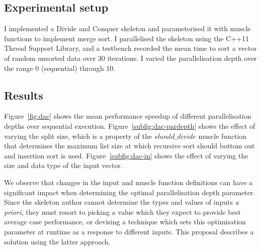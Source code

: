 \subsection{Experimental setup}
I implemented a Divide and Conquer skeleton and parameterised it with
muscle functions to implement merge sort. I parallelised the skeleton
using the C++11 Thread Support Library, and a testbench recorded the
mean time to sort a vector of random unsorted data over 30
iterations. I varied the parallelisation depth over the range 0
(sequential) through 10.

\subsection{Results}
Figure~\ref{fig:dac} shows the mean performance speedup of different
parallelisation depths over sequential
execution. Figure~\ref{subfig:dac-pardepth} shows the effect of
varying the split size, which is a property of the $should\_divide$
muscle function that determines the maximum list size at which
recursive sort should bottom out and insertion sort is
used. Figure~\ref{subfig:dac-in} shows the effect of varying the size
and data type of the input vector.

We observe that changes in the input and muscle function definitions
can have a significant impact when determining the optimal
parallelisation depth parameter. Since the skeleton author cannot
determine the types and values of inputs \emph{a priori}, they must
resort to picking a value which they expect to provide best average
case performance, or devising a technique which sets this optimisation
parameter at runtime as a response to different inputs. This proposal
describes a solution using the latter approach.
